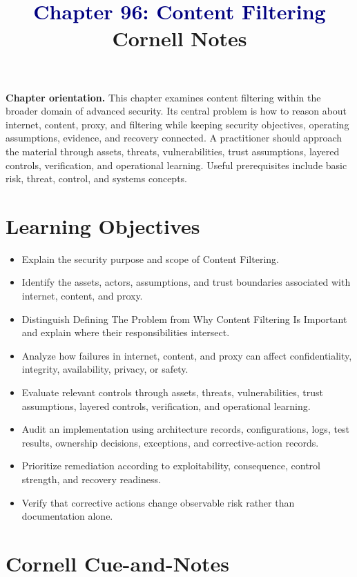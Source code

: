 \documentclass[11pt]{article}
\title{\textcolor{Navy}{Chapter 96: Content Filtering}\\[2mm]\large Cornell Notes}
\author{}
\date{}
\begin{document}
\maketitle
\thispagestyle{fancy}
\vspace{-1.5em}
\begin{orientationbox}
\textbf{Chapter orientation.} This chapter examines content filtering within the broader domain of advanced security. Its central problem is how to reason about internet, content, proxy, and filtering while keeping security objectives, operating assumptions, evidence, and recovery connected. A practitioner should approach the material through assets, threats, vulnerabilities, trust assumptions, layered controls, verification, and operational learning. Useful prerequisites include basic risk, threat, control, and systems concepts.
\end{orientationbox}
\section*{Learning Objectives}
\begin{itemize}
\item Explain the security purpose and scope of Content Filtering.
\item Identify the assets, actors, assumptions, and trust boundaries associated with internet, content, and proxy.
\item Distinguish Defining The Problem from Why Content Filtering Is Important and explain where their responsibilities intersect.
\item Analyze how failures in internet, content, and proxy can affect confidentiality, integrity, availability, privacy, or safety.
\item Evaluate relevant controls through assets, threats, vulnerabilities, trust assumptions, layered controls, verification, and operational learning.
\item Audit an implementation using architecture records, configurations, logs, test results, ownership decisions, exceptions, and corrective-action records.
\item Prioritize remediation according to exploitability, consequence, control strength, and recovery readiness.
\item Verify that corrective actions change observable risk rather than documentation alone.
\end{itemize}
\section*{Cornell Cue-and-Notes}
\end{document}
